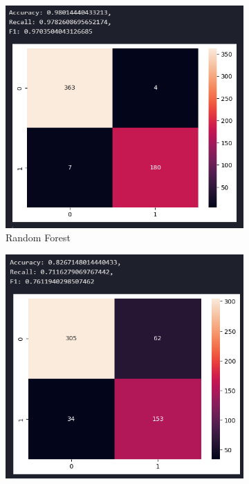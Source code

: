 \documentclass[12pt]{report}
\begin{document}
\begin{figure}[H]
    \centering
    \begin{subfigure}[b]{0.3\textwidth}
        \includegraphics[width=\textwidth]{ModelDev/Iteration1/Matrices/Unseen/MetricsIncluded/RF.png}
        \caption{Random Forest}
        \label{fig:RFUnseen}
    \end{subfigure}
    \hfill
    \begin{subfigure}[b]{0.3\textwidth}
        \includegraphics[width=\textwidth]{ModelDev/Iteration1/Matrices/Unseen/MetricsIncluded/SVC.png}

\end{subfigure}
\end{figure}
\end{document}
